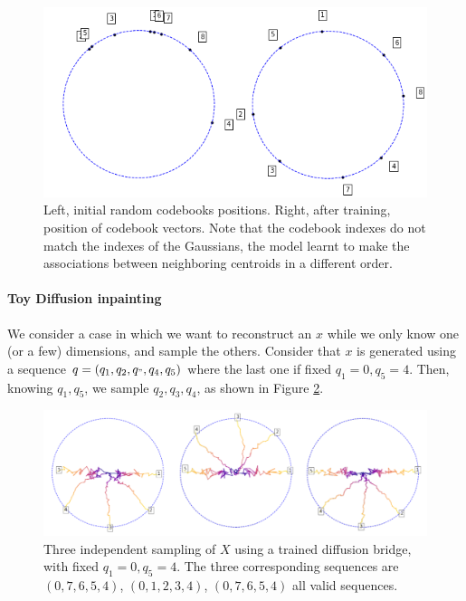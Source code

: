 \documentclass{article}
\theoremstyle{plain}
\theoremstyle{definition}
\theoremstyle{remark}
\begin{document}
\begin{figure}[h!]
    \centering
    \includegraphics[scale=0.4]{images/codebookstraining.png}
    \caption{Left, initial random codebooks positions. Right, after training, position of codebook vectors. Note that the codebook indexes do not match the indexes of the Gaussians, the model learnt to make the associations between neighboring centroids in a different order.}
    \label{ap:codebooks}
\end{figure}

\paragraph{Toy Diffusion inpainting}

\label{ap:toyinpainting}
We consider a case in which we want to reconstruct an $x$ while we only know one (or a few) dimensions, and sample the others. Consider that $x$ is generated using a sequence $q= (q_1,q_2,q_",q_4,q_5)$ where the last one if fixed $q_1 = 0, q_5 = 4$. Then, knowing $q_1, q_5$, we sample $q_2,q_3,q_4$, as shown in Figure \ref{fig:fixeddim}.
\begin{figure}[h!]
    \centering
    \includegraphics[scale=0.5]{./samplesFixed.pdf}
    \caption{Three independent sampling of $X$ using a trained diffusion bridge, with fixed $q_1 = 0, q_5 = 4$. The three corresponding sequences are $(0,7,6,5,4)$, $(0,1,2,3,4)$, $(0,7,6,5,4)$ all valid sequences.}
    \label{fig:fixeddim}
\end{figure}
\end{document}
